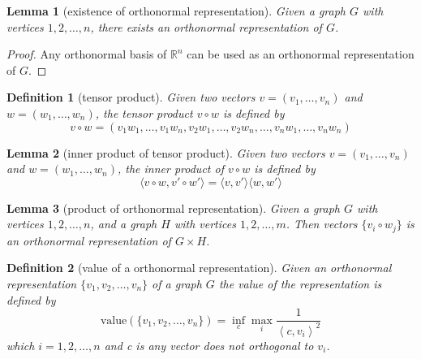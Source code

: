 \documentclass{article}
\newtheorem{definition}{Definition}[section]
\newtheorem{lemma}{Lemma}[section]
\begin{document}
      \begin{lemma}[existence of orthonormal representation]\label{lemma:existenceOfOrthonormalRepresentation}
            Given a graph $ G $ with vertices $ 1,2,\dots,n $, there exists an orthonormal representation of $ G $.
      \end{lemma}

      \begin{proof}
            Any orthonormal basis of $ \mathbb{R}^n $ can be used as an orthonormal representation of $ G $.
      \end{proof}

      \begin{definition}[tensor product]\label{def:tensorProduct}
            Given two vectors $ v = \left(v_{1},\dots,v_{n}\right) $ and $ w = \left(w_{1},\dots,w_{n}\right) $, the tensor product $ v \circ w $ is defined by
            \begin{equation}
                  v \circ w = \left(
                        v_{1}w_{1},\dots,v_{1}w_{n},
                        v_{2}w_{1},\dots,v_{2}w_{n},
                        \dots,
                        v_{n}w_{1},\dots,v_{n}w_{n}
                        \right)
            \end{equation}
      \end{definition}

      \begin{lemma}[inner product of tensor product]\label{lemma:innerProductOfTensorProduct}
            Given two vectors $ v = \left(v_{1},\dots,v_{n}\right) $ and $ w = \left(w_{1},\dots,w_{n}\right) $, the inner product of $ v \circ w $ is defined by
            \begin{equation}
                  \langle v \circ w, v' \circ w' \rangle = \langle v, v' \rangle \langle w, w' \rangle
            \end{equation}
            
      \end{lemma}

      \begin{lemma}[product of orthonormal representation]\label{lemma:productOfOrthonormalRepresentation}
            Given a graph $ G $ with vertices $ 1,2,\dots,n $, and a graph $ H $ with vertices $ 1,2,\dots,m $. Then vectors $\{ v_{i}\circ w_{j} \}$ is an orthonormal representation of $ G \times H $.
      \end{lemma}

      \begin{definition}[value of a orthonormal representation]\label{def:valueOfOrthonormalRepresentation}
            Given an orthonormal representation $ \{v_1, v_2, \dots, v_n\} $ of a graph $ G $ the value of the representation is defined by
            \begin{equation}
                  \text{value}(\{v_1, v_2, \dots, v_n\}) = \inf_{c}\max_{i} \frac{1}{\left<c,v_{i}\right>^2}
            \end{equation}
            which $ i=1,2,\dots,n $ and c is any vector does not orthogonal to $ v_i $.
      \end{definition}
\end{document}
